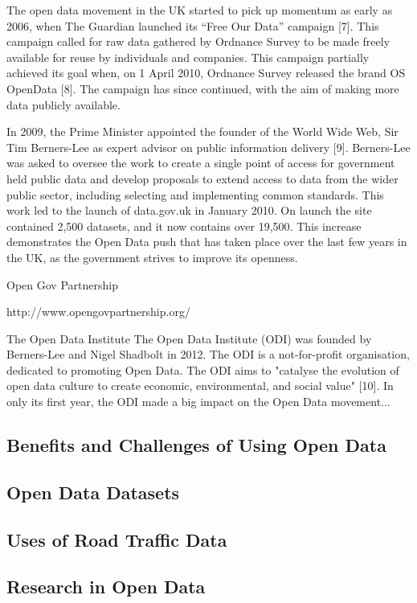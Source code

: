 \documentclass[authoryearcitations]{UoYCSproject}
\begin{document}
The open data movement in the UK started to pick up momentum as early as 2006, when The Guardian launched its “Free Our Data” campaign [7]. This campaign called for raw data gathered by Ordnance Survey to be made freely available for reuse by individuals and companies. This campaign partially achieved its goal when, on 1 April 2010, Ordnance Survey released the brand OS OpenData [8]. The campaign has since continued, with the aim of making more data publicly available. 

In 2009, the Prime Minister appointed the founder of the World Wide Web, Sir Tim Berners-Lee as expert advisor on public information delivery [9]. Berners-Lee was asked to oversee the work to create a single point of access for government held public data and develop proposals to extend access to data from the wider public sector, including selecting and implementing common standards. This work led to the launch of data.gov.uk in January 2010. On launch the site contained 2,500 datasets, and it now contains over 19,500. This increase demonstrates the Open Data push that has taken place over the last few years in the UK, as the government strives to improve its openness. 

Open Gov Partnership

http://www.opengovpartnership.org/

The Open Data Institute
The Open Data Institute (ODI) was founded by Berners-Lee and Nigel Shadbolt in 2012. The ODI is a not-for-profit organisation, dedicated to promoting Open Data. The ODI aims to "catalyse the evolution of open data culture to create economic, environmental, and social value" [10]. In only its first year, the ODI made a big impact on the Open Data movement...

\subsection{Benefits and Challenges of Using Open Data}

\subsection{Open Data Datasets}

\subsection{Uses of Road Traffic Data}

\subsection{Research in Open Data}
\end{document}
